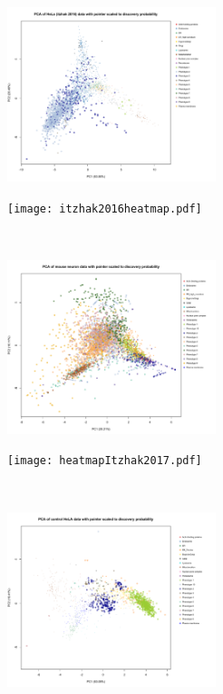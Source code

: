 \documentclass[12pt,english]{article}
\begin{document}
\begin{figure}
	\begin{subfigure}[t]{0.5\textwidth}
		\centering
		\includegraphics[height=2in]{pcaItzhak2016.pdf}
		\caption{}
	\end{subfigure}
	\begin{subfigure}[t]{0.5\textwidth}
		\centering
		\texttt{[image: itzhak2016heatmap.pdf]}
		\caption{}
	\end{subfigure}
	~
	\begin{subfigure}[t]{0.5\textwidth}
		\centering
		\includegraphics[height=2in]{pcaItzhak2017.pdf}
		\caption{}
	\end{subfigure}
	\begin{subfigure}[t]{0.5\textwidth}
		\centering
		\texttt{[image: heatmapItzhak2017.pdf]}
		\caption{}
	\end{subfigure}
	~
	\begin{subfigure}[t]{0.5\textwidth}
		\centering
		\includegraphics[height=2in]{pcaHirst.pdf}
		\caption{}
	\end{subfigure}

\end{figure}
\end{document}
